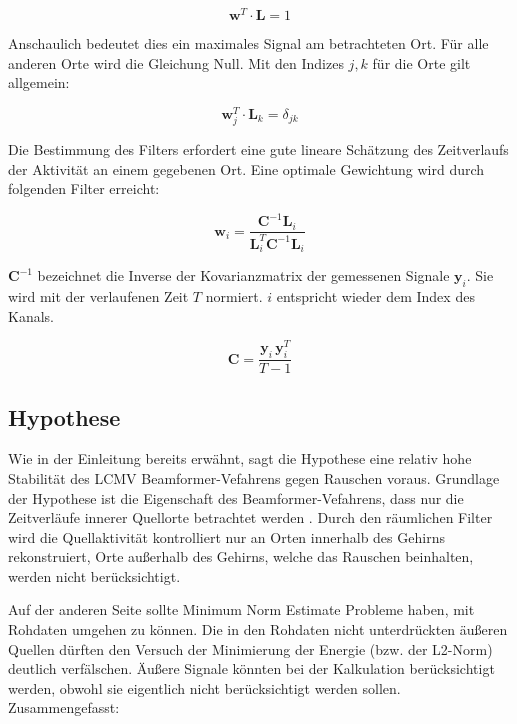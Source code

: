 \documentclass[doc,a4paper,12pt]{apa6}
\newcommand{\mx}[1]{\mathbf{#1}}
\begin{document}
\begin{equation}
\mx{w}^T \cdot \mx{L} = 1
\end{equation}

Anschaulich bedeutet dies ein maximales Signal am betrachteten Ort. Für alle anderen Orte wird die Gleichung Null. Mit den Indizes $j,k$ für die Orte gilt allgemein:

\begin{equation}
\mx{w}^T_{j} \cdot \mx{L}_{k} = \delta_{jk}
\end{equation}

Die Bestimmung des Filters erfordert eine gute lineare Schätzung des Zeitverlaufs der Aktivität an einem gegebenen Ort. Eine optimale Gewichtung \parencite[z.B.][]{haykin2008adaptive} wird durch folgenden Filter erreicht:

\begin{equation}
\label{eq:beam-filter-w}
\mx{w}_i = \frac{\mx{C}^{-1} \mx{L}_i}{\mx{L}^T_i \mx{C}^{-1} \mx{L}_i}
\end{equation}

$\mx{C}^{-1}$ bezeichnet die Inverse der Kovarianzmatrix der gemessenen Signale $\mx{y}_i$. Sie wird mit der verlaufenen Zeit $T$ normiert. $i$ entspricht wieder dem Index des Kanals.

\begin{equation}
\mx{C} = \frac{\mx{y}_i\,\mx{y}_i^T}{T-1}
\end{equation}

\subsection{Hypothese}
\label{sec:hypo}

Wie in der Einleitung bereits erwähnt, sagt die Hypothese eine relativ hohe Stabilität des LCMV Beamformer-Vefahrens gegen Rauschen voraus. Grundlage der Hypothese ist die Eigenschaft des Beamformer-Vefahrens, dass nur die Zeitverläufe innerer Quellorte betrachtet werden \parencite{van1997localization}. Durch den räumlichen Filter wird die Quellaktivität kontrolliert nur an Orten innerhalb des Gehirns rekonstruiert, Orte außerhalb des Gehirns, welche das Rauschen beinhalten, werden nicht berücksichtigt.

Auf der anderen Seite sollte Minimum Norm Estimate Probleme haben, mit Rohdaten umgehen zu können. Die in den Rohdaten nicht unterdrückten äußeren Quellen dürften den Versuch der Minimierung der Energie (bzw. der L2-Norm) deutlich verfälschen. Äußere Signale könnten bei der Kalkulation berücksichtigt werden, obwohl sie eigentlich nicht berücksichtigt werden sollen. Zusammengefasst:
\end{document}
